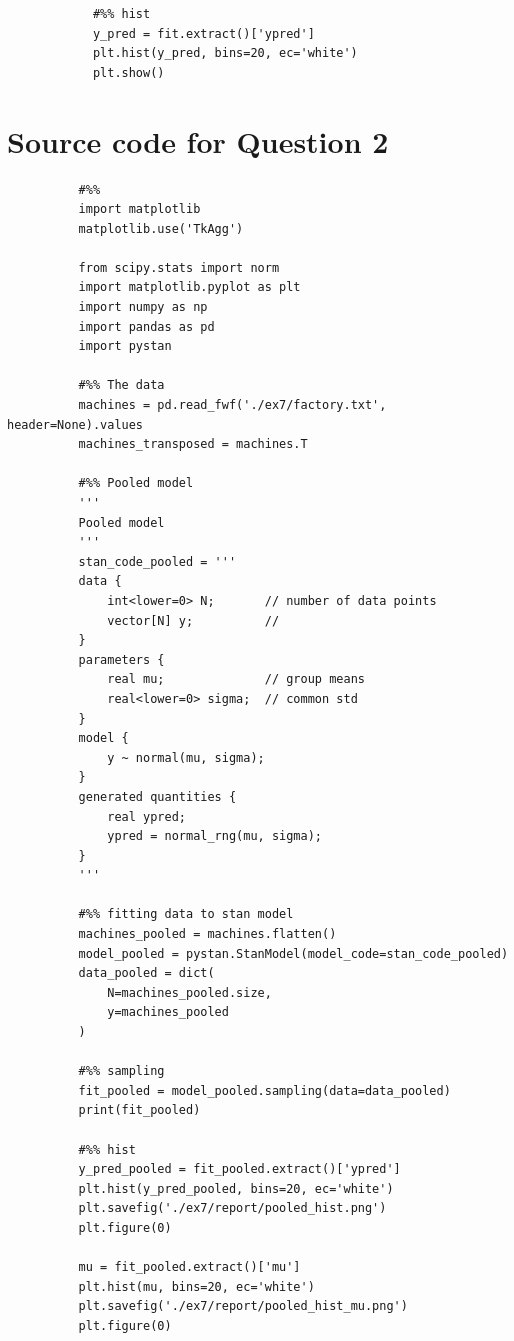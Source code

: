 \documentclass[11pt,a4paper,english]{article}
\begin{document}
\begin{appendices}
\begin{verbatim}
            #%% hist
            y_pred = fit.extract()['ypred']
            plt.hist(y_pred, bins=20, ec='white')
            plt.show()
        \end{verbatim}

      \section{Source code for Question 2}
        \begin{verbatim}
          #%%
          import matplotlib
          matplotlib.use('TkAgg')

          from scipy.stats import norm
          import matplotlib.pyplot as plt
          import numpy as np
          import pandas as pd
          import pystan

          #%% The data
          machines = pd.read_fwf('./ex7/factory.txt', header=None).values
          machines_transposed = machines.T

          #%% Pooled model
          '''
          Pooled model
          '''
          stan_code_pooled = '''
          data {
              int<lower=0> N;       // number of data points
              vector[N] y;          //
          }
          parameters {
              real mu;              // group means
              real<lower=0> sigma;  // common std
          }
          model {
              y ~ normal(mu, sigma);
          }
          generated quantities {
              real ypred;
              ypred = normal_rng(mu, sigma);
          }
          '''

          #%% fitting data to stan model
          machines_pooled = machines.flatten()
          model_pooled = pystan.StanModel(model_code=stan_code_pooled)
          data_pooled = dict(
              N=machines_pooled.size,
              y=machines_pooled
          )

          #%% sampling
          fit_pooled = model_pooled.sampling(data=data_pooled)
          print(fit_pooled)

          #%% hist
          y_pred_pooled = fit_pooled.extract()['ypred']
          plt.hist(y_pred_pooled, bins=20, ec='white')
          plt.savefig('./ex7/report/pooled_hist.png')
          plt.figure(0)

          mu = fit_pooled.extract()['mu']
          plt.hist(mu, bins=20, ec='white')
          plt.savefig('./ex7/report/pooled_hist_mu.png')
          plt.figure(0)


\end{verbatim}
\end{appendices}
\end{document}
